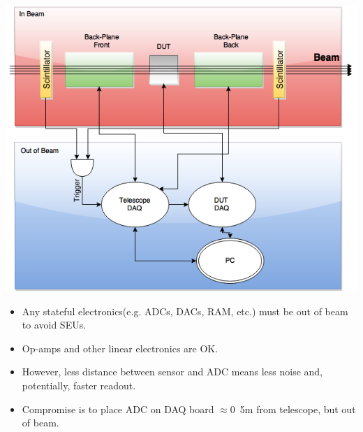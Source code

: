 \documentclass{beamer}
\begin{document}
\begin{frame}
  \centering
  \includegraphics[height=0.8\textheight]{figures/Telescope_Hierarchy}
\end{frame}


\begin{frame}
  \begin{itemize}
    \item Any stateful electronics(e.g. ADCs, DACs, RAM, etc.) must be out of beam to avoid SEUs.
    \item Op-amps and other linear electronics are OK.
    \item However, less distance between sensor and ADC means less noise and, potentially, faster readout.
    \item Compromise is to place ADC on DAQ board $\approx$\unit{0.5}{m} from telescope, but out of beam.
  \end{itemize}
\end{frame}
\end{document}
